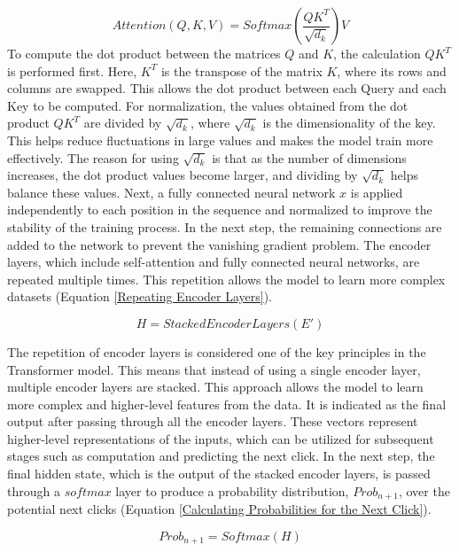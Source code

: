 \documentclass[sn-mathphys-num, Numbered]{sn-jnl}%
\theoremstyle{thmstyleone}%
\theoremstyle{thmstyletwo}%
\theoremstyle{thmstylethree}%
\providecommand{\DIFaddbegin}{} %
\providecommand{\DIFaddend}{} %
\newcommand{\DIFaddincludegraphics}[2][]{{\color{blue}\fbox{\DIFOincludegraphics[#1]{#2}}}} %
\DeclareRobustCommand{\DIFaddbegin}{\DIFOaddbegin \let\includegraphics\DIFaddincludegraphics} %
\DeclareRobustCommand{\DIFaddend}{\DIFOaddend \let\includegraphics\DIFOincludegraphics} %
\begin{document}
\begin{equation}\label{Attentionmchm4}
	Attention (Q, K, V) = {Softmax}\left(\frac{QK^T}{\sqrt{d_k}}\right) V
\end{equation}
\DIFaddbegin \smallskip
\DIFaddend To compute the dot product between the matrices $Q$ and $K$, the calculation \( QK^T \) is performed first. Here, \( K^T \) is the transpose of the matrix \( K \), where its rows and columns are swapped. This allows the dot product between each Query and each Key to be computed.
For normalization, the values obtained from the dot product \( QK^T \) are divided by \( \sqrt{d_k} \), where \( \sqrt{d_k} \) is the dimensionality of the key. This helps reduce fluctuations in large values and makes the model train more effectively. The reason for using \( \sqrt{d_k} \) is that as the number of dimensions increases, the dot product values become larger, and dividing by \( \sqrt{d_k} \) helps balance these values.
Next, a fully connected neural network $x$ is applied independently to each position in the sequence and normalized to improve the stability of the training process.
In the next step, the remaining connections are added to the network to prevent the vanishing gradient problem. The encoder layers, which include self-attention and fully connected neural networks, are repeated multiple times. This repetition allows the model to learn more complex datasets (Equation \ref{Repeating Encoder Layers}).

\begin{equation}\label{Repeating Encoder Layers}
	H = {StackedEncoderLayers}(E')
\end{equation}

The repetition of encoder layers is considered one of the key principles in the Transformer model. This means that instead of using a single encoder layer, multiple encoder layers are stacked. This approach allows the model to learn more complex and higher-level features from the data.
It is indicated as the final output after passing through all the encoder layers. These vectors represent higher-level representations of the inputs, which can be utilized for subsequent stages such as computation and predicting the next click.
In the next step, the final hidden state, which is the output of the stacked encoder layers, is passed through a $softmax$ layer to produce a probability distribution, $Prob_{n+1}$, over the potential next clicks (Equation \ref{Calculating Probabilities for the Next Click}).

\begin{equation}\label{Calculating Probabilities for the Next Click}
	Prob_{n+1} = {Softmax}(H)
\end{equation}
\end{document}
